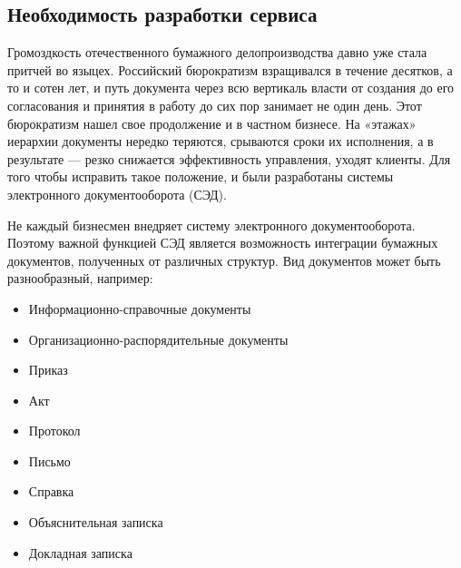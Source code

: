 \subsection{Необходимость разработки сервиса}

Громоздкость отечественного бумажного делопроизводства давно уже стала притчей во языцех. Российский бюрократизм взращивался в течение десятков, а то и сотен лет, и путь документа через всю вертикаль власти от создания до его согласования и принятия в работу до сих пор занимает не один день. Этот бюрократизм нашел свое продолжение и в частном бизнесе. На «этажах» иерархии документы нередко теряются, срываются сроки их исполнения, а в результате — резко снижается эффективность управления, уходят клиенты. Для того чтобы исправить такое положение, и были разработаны системы электронного документооборота (СЭД).

Не каждый бизнесмен внедряет систему электронного документооборота. Поэтому важной функцией СЭД является возможность интеграции бумажных документов, полученных от различных структур. Вид документов может быть разнообразный, например:
\begin{itemize}
  \item Информационно-справочные документы
  \item Организационно-распорядительные документы
  \item Приказ
  \item Акт
  \item Протокол
  \item Письмо
  \item Справка
  \item Объяснительная записка
  \item Докладная записка
\end{itemize}

